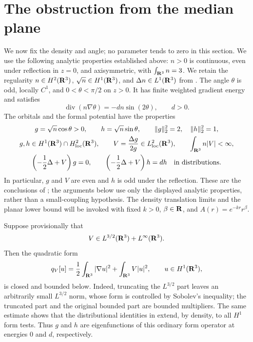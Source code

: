 \section{The obstruction from the median plane}
\label{sec:obstruction}

We now fix the density and angle; no parameter tends to zero in this
section.  We use the following analytic properties established above:
\(n>0\) is continuous, even under reflection in \(z=0\), and axisymmetric,
with \(\int_{\mathbf R^3}n=3\).  We retain the regularity
\(n\in H^2(\mathbf R^3)\), \(\sqrt n\in H^1(\mathbf R^3)\), and
\(\Delta n\in L^1(\mathbf R^3)\) from .
The angle \(\theta\) is odd, locally \(C^1\), and
\(0<\theta<\pi/2\) on \(z>0\).  It has finite weighted gradient energy and
satisfies
\begin{equation}
 \operatorname{div}(n\nabla\theta)=-d n\sin(2\theta),
 \qquad d>0.
 \label{eq:obstruction-angle}
\end{equation}
The orbitals and the formal potential have the properties
\begin{gather}
 g=\sqrt n\cos\theta>0,\qquad h=\sqrt n\sin\theta,
 \qquad \|g\|_2^2=2,\quad \|h\|_2^2=1,
 \label{eq:obstruction-normalization}\\
 g,h\in H^1(\mathbf R^3)\cap H^2_{\mathrm{loc}}(\mathbf R^3),\qquad
 V=\frac{\Delta g}{2g}\in L^2_{\mathrm{loc}}(\mathbf R^3),
 \qquad \int_{\mathbf R^3}n|V|<\infty,
 \label{eq:obstruction-regularity}\\
 \left(-\frac12\Delta+V\right)g=0,\qquad
 \left(-\frac12\Delta+V\right)h=dh
 \quad\text{in distributions}.
 \label{eq:obstruction-orbitals}
\end{gather}
In particular, \(g\) and \(V\) are even and \(h\) is odd under the
reflection.  These are the conclusions of
; the arguments below
use only the displayed analytic properties, rather than a small-coupling
hypothesis.  The density translation limits and the planar lower bound
will be invoked with fixed \(k>0\), \(\beta\in\mathbf R\), and
\(A(r)=e^{-kr}r^\beta\).

Suppose provisionally that
\begin{equation}
 V\in L^{3/2}(\mathbf R^3)+L^\infty(\mathbf R^3).
 \label{eq:admissible-formal-potential}
\end{equation}
Then the quadratic form
\[
 q_V[u]=\frac12\int_{\mathbf R^3}|\nabla u|^2+
              \int_{\mathbf R^3}V|u|^2,
 \qquad u\in H^1(\mathbf R^3),
\]
is closed and bounded below.  Indeed, truncating the \(L^{3/2}\) part
leaves an arbitrarily small \(L^{3/2}\) norm, whose form is controlled by
Sobolev's inequality; the truncated part and the original bounded part
are bounded multipliers.  The same estimate shows that the distributional
identities in  extend, by density, to all
\(H^1\) form tests.  Thus \(g\) and \(h\) are eigenfunctions of this
ordinary form operator at energies \(0\) and \(d\), respectively.

